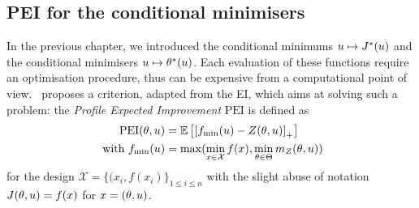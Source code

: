 \documentclass[../../Main_ManuscritThese.tex]{subfiles}
\begin{document}




\subsection{PEI for the conditional minimisers}
\label{sec:PEI_criterion}
In the previous chapter, we introduced the conditional minimums
$u\mapsto J^*(u)$ and the conditional minimisers
$u \mapsto \theta^*(u)$. Each evaluation of these functions require
an optimisation procedure, thus can be expensive from a computational
point of view.~\cite{ginsbourger_bayesian_2014} proposes a criterion,
adapted from the EI, which aims at solving such a problem: the
\emph{Profile Expected Improvement} $\mathrm{PEI}$ is defined as
\begin{align}
  \label{eq:def_PEI}
  \mathrm{PEI}(\theta, u)&= \mathbb{E}\left[\left[f_{\min}(u) - Z(\theta, u)\right]_+\right]\\  \text{ with } f_{\min}(u) &= \max(\min_{x\in\mathcal{X}} f(x), \min_{\theta \in \Theta} m_Z(\theta, u))
\end{align}
for the design $\mathcal{X} = \{(x_i, f(x_i)\}_{1\leq i\leq n}$ with
the slight abuse of notation $J(\theta, u) = f(x)$ for $x=(\theta, u)$.
\end{document}
